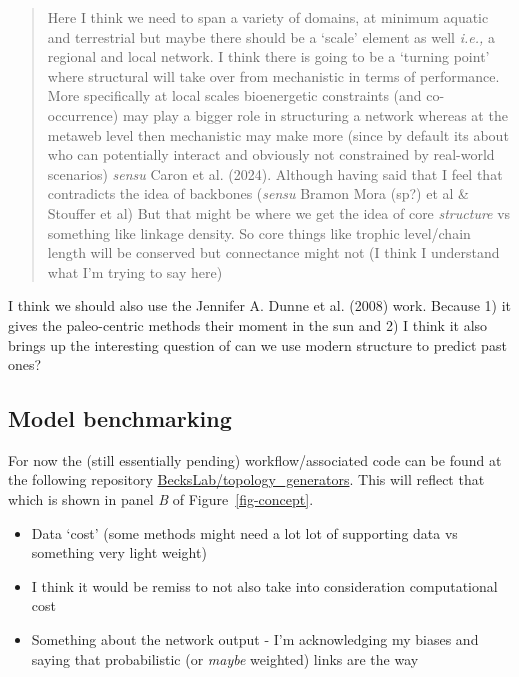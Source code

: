 \documentclass[
  letterpaper,
  DIV=11,
  numbers=noendperiod]{scrartcl}
\providecommand{\tightlist}{%
  \setlength{\itemsep}{0pt}\setlength{\parskip}{0pt}}\usepackage{longtable,booktabs,array}
\begin{document}
\begin{quote}
Here I think we need to span a variety of domains, at minimum aquatic
and terrestrial but maybe there should be a `scale' element as well
\emph{i.e.,} a regional and local network. I think there is going to be
a `turning point' where structural will take over from mechanistic in
terms of performance. More specifically at local scales bioenergetic
constraints (and co-occurrence) may play a bigger role in structuring a
network whereas at the metaweb level then mechanistic may make more
(since by default its about who can potentially interact and obviously
not constrained by real-world scenarios) \emph{sensu} Caron et al.
(2024). Although having said that I feel that contradicts the idea of
backbones (\emph{sensu} Bramon Mora (sp?) et al \& Stouffer et al) But
that might be where we get the idea of core \emph{structure} vs
something like linkage density. So core things like trophic level/chain
length will be conserved but connectance might not (I think I understand
what I'm trying to say here)
\end{quote}

I think we should also use the Jennifer A. Dunne et al. (2008) work.
Because 1) it gives the paleo-centric methods their moment in the sun
and 2) I think it also brings up the interesting question of can we use
modern structure to predict past ones?

\subsection{Model benchmarking}\label{sec-model-benchmarking}

For now the (still essentially pending) workflow/associated code can be
found at the following repository
\href{https://github.com/BecksLab/topology_generators}{BecksLab/topology\_generators}.
This will reflect that which is shown in panel \emph{B} of
Figure~\ref{fig-concept}.

\begin{itemize}
\tightlist
\item
  Data `cost' (some methods might need a lot lot of supporting data vs
  something very light weight)
\item
  I think it would be remiss to not also take into consideration
  computational cost
\item
  Something about the network output - I'm acknowledging my biases and
  saying that probabilistic (or \emph{maybe} weighted) links are the way
\end{itemize}
\end{document}
